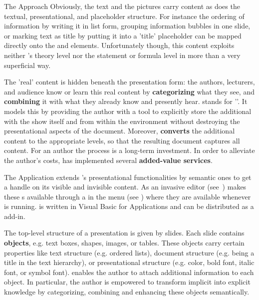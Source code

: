 \begin{omgroup}[id=cpoint,short=\cpoint,creators=ako]
\begin{omgroup}[id=cpoint.background]{The {\cpoint} Approach}
Obviously, the text and the pictures carry content as does the textual, presentational,
and placeholder structure.  For instance the ordering of information by writing it in list
form, grouping information bubbles in one slide, or marking text as title by putting it
into a 'title' placeholder can be mapped directly onto the {\omdoc} {}
and {} elements.  Unfortunately though, this content exploits neither
{\omdoc}'s theory level nor the statement or formula level in more than a very superficial
way.

The 'real' content is hidden beneath the presentation form: the authors, lecturers, and
audience know or learn this real content by {\bf categorizing} what they see, and {\bf
  combining} it with what they already know and presently hear. {\cpoint} stands for '{}'. It models this by
providing the author with a tool to explicitly store the additional {}
with the {\ppt} show itself and from within the {\ppt} environment without destroying the
presentational aspects of the {\ppt} document. Moreover, {\cpoint} {\bf converts} the
additional content to the appropriate {\omdoc} levels, so that the resulting {\omdoc}
document captures all content.  For an author the {} process is
a long-term investment. In order to alleviate the author's costs, {\cpoint} has
implemented several {\bf added-value services}.
\end{omgroup}

\begin{omgroup}[id=cpoint.app]{The {\cpoint} Application}
{\cpoint} extends {\ppt}'s
presentational functionalities by semantic ones to get a handle on its visible and
invisible content. As an invasive editor (see~\cite{Kohlhase:OvercomingProprietaryHurdles}) {\cpoint} makes these
{s} available through a {} in the
{\ppt} menu (see {}) where they are available whenever {\ppt} is
running. {\cpoint} is written in Visual Basic for Applications and can be distributed as a
{\ppt} add-in.

\begin{myfig}{menubar}{The {\cpoint} Menu Bar}
  \texttt{[image: \\projectsPath\{cpoint/CPointMenuBar]}}
\end{myfig}

The top-level structure of a {\ppt} presentation is given by slides.  Each slide contains
{\bf {\ppt} objects}, e.g. text boxes, shapes, images, or tables. These objects carry
certain properties like text structure (e.g. ordered lists), document structure
(e.g. being a title in the text hierarchy), or presentational structure (e.g. color, bold
font, italic font, or symbol font). {\cpoint} enables the author to attach additional
information to each {\ppt} object. In particular, the author is empowered to transform
implicit into explicit knowledge by categorizing, combining and enhancing these objects semantically.


\end{omgroup}
\end{omgroup}
